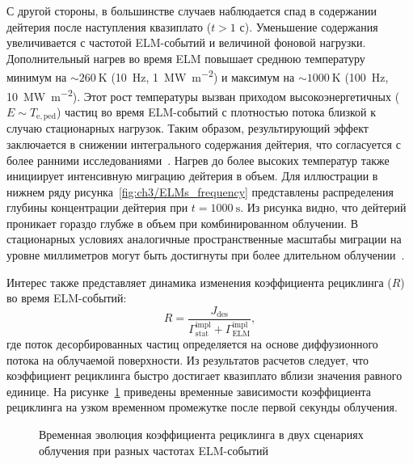 С другой стороны, в большинстве случаев наблюдается спад в содержании дейтерия после наступления квазиплато ($t>1$ с). Уменьшение содержания увеличивается с частотой ELM-событий и величиной фоновой нагрузки. Дополнительный нагрев во время ELM повышает среднюю температуру минимум на $\sim\SI{260}{\kelvin}$ (\SI{10}{\hertz}, \SI{1}{\mega\watt\per\meter\squared}) и максимум на $\sim\SI{1000}{\kelvin}$ (\SI{100}{\hertz}, \SI{10}{\mega\watt\per\meter\squared}). Этот рост температуры вызван приходом высокоэнергетичных ($E\sim T_{\mathrm{e,ped}}$) частиц во время ELM-событий с плотностью потока близкой к случаю стационарных нагрузок. Таким образом, результирующий эффект заключается в снижении интегрального содержания дейтерия, что согласуется с более ранними исследованиями~\cite{Hu2015}. Нагрев до более высоких температур также инициирует интенсивную миграцию дейтерия в объем. Для иллюстрации в нижнем ряду рисунка~\cref{fig:ch3/ELMs_frequency} представлены распределения глубины концентрации дейтерия при $t=\SI{1000}{\second}$. Из рисунка видно, что дейтерий проникает гораздо глубже в объем при комбинированном облучении. В стационарных условиях аналогичные пространственные масштабы миграции на уровне миллиметров могут быть достигнуты при более длительном облучении~\cite{Hodille2021}.

Интерес также представляет динамика изменения коэффициента рециклинга (\( R \)) во время ELM-событий:
\begin{equation}
	R = \frac{J_\mathrm{des}}{\Gamma^{\mathrm{impl}}_\mathrm{stat}+\Gamma^{\mathrm{impl}}_\mathrm{ELM}},
\end{equation}
где поток десорбированных частиц определяется на основе диффузионного потока на облучаемой поверхности. Из результатов расчетов следует, что коэффициент рециклинга быстро достигает квазиплато вблизи значения равного единице. На рисунке~\cref{fig:ch3/R_freq} приведены временные зависимости коэффициента рециклинга на узком временном промежутке после первой секунды облучения.   
\begin{figure}[ht]
	\caption{Временная эволюция коэффициента рециклинга в двух сценариях облучения при разных частотах ELM-событий}\label{fig:ch3/R_freq}
\end{figure}

